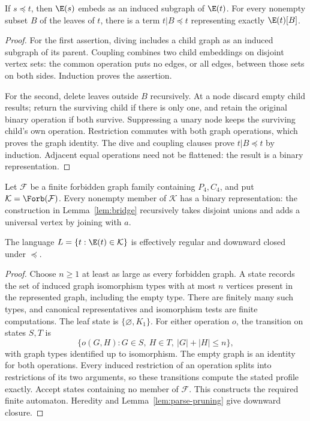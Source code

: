 \begin{lemma}\label{lem:parse-pruning}
If $s\preceq t$, then $\E(s)$ embeds as an induced subgraph of $\E(t)$.
For every nonempty subset $B$ of the leaves of $t$, there is a term
$t|B\preceq t$ representing exactly $\E(t)[B]$.
\end{lemma}
\begin{proof}
For the first assertion, diving includes a child graph as an induced
subgraph of its parent. Coupling combines two child embeddings on disjoint
vertex sets: the common operation puts no edges, or all edges, between
those sets on both sides. Induction proves the assertion.

For the second, delete leaves outside $B$ recursively. At a node discard
empty child results; return the surviving child if there is only one,
and retain the original binary operation if both survive. Suppressing a
unary node keeps the surviving child's own operation. Restriction commutes
with both graph operations, which proves the graph identity. The dive and
coupling clauses prove $t|B\preceq t$ by induction. Adjacent equal
operations need not be flattened: the result is a binary representation.
\end{proof}

Let $\mathcal F$ be a finite forbidden graph family containing $P_4,C_4$,
and put $\mathcal K=\Forb(\mathcal F)$. Every nonempty member of
$\mathcal K$ has a binary representation: the construction in
Lemma~\ref{lem:bridge} recursively takes disjoint unions and adds a
universal vertex by joining with $a$.

\begin{lemma}\label{lem:parse-regular}
The language $L=\{t:\E(t)\in\mathcal K\}$ is effectively regular and
downward closed under $\preceq$.
\end{lemma}
\begin{proof}
Choose $n\geq1$ at least as large as every forbidden graph. A state records
the set of induced graph isomorphism types with at most $n$ vertices present
in the represented graph, including the empty type. There are finitely many
such types, and canonical representatives and isomorphism tests are finite
computations. The leaf state is $\{\varnothing,K_1\}$. For either operation
$o$, the transition on states $S,T$ is
\[
 \{o(G,H):G\in S,\ H\in T,\ |G|+|H|\leq n\},
\]
with graph types identified up to isomorphism. The empty graph is an
identity for both operations. Every induced restriction of an operation
splits into restrictions of its two arguments, so these transitions compute
the stated profile exactly. Accept states containing no member of
$\mathcal F$. This constructs the required finite automaton. Heredity
and Lemma~\ref{lem:parse-pruning} give downward closure.
\end{proof}

